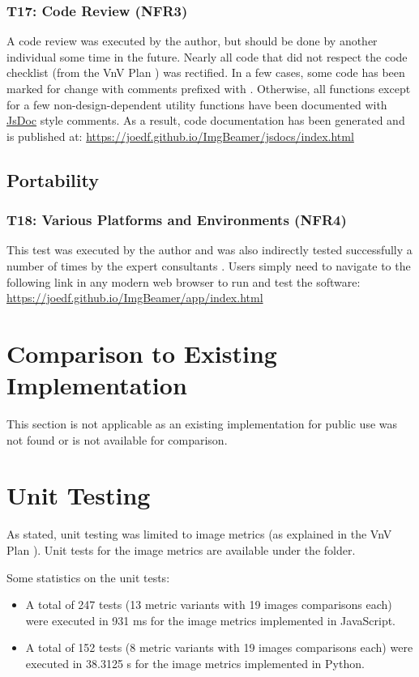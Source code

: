 \documentclass[12pt, titlepage]{article}
\begin{document}
\subsubsection{T17: Code Review (NFR3)}
A code review was executed by the author, but should be done by another individual some time in the future.
Nearly all code that did not respect the code checklist (from the VnV Plan \cite{VnV_plan})
was rectified. In a few cases, some code has been marked for change with comments prefixed with
. Otherwise, all functions except for a few non-design-dependent utility functions
have been documented with \href{https://github.com/jsdoc/jsdoc}{JsDoc} style comments.
As a result, code documentation has been generated and is published at:
\url{https://joedf.github.io/ImgBeamer/jsdocs/index.html}

\subsection{Portability} \label{ss_portability}
\subsubsection{T18: Various Platforms and Environments (NFR4)}
This test was executed by the author and was also indirectly tested successfully a number of times
by the expert consultants \cite{VnV_plan}. Users simply need to navigate to the following link
in any modern web browser to run and test the software:
\url{https://joedf.github.io/ImgBeamer/app/index.html}
	
\section{Comparison to Existing Implementation}	

This section is not applicable as an existing implementation for public use was not found or
is not available for comparison.

\section{Unit Testing} \label{ss_unittest}
As stated, unit testing was limited to image metrics (as explained in the VnV Plan \cite{VnV_plan}).
Unit tests for the image metrics are available under the  folder.

Some statistics on the unit tests:
\begin{itemize}
  \item A total of 247 tests (13 metric variants with 19 images comparisons each) were
    executed in 931 \si{ms} for the image metrics implemented in JavaScript.
  \item A total of 152 tests (8 metric variants with 19 images comparisons each) were
    executed in 38.3125 \si{s} for the image metrics implemented in Python.
\end{itemize}
\end{document}
